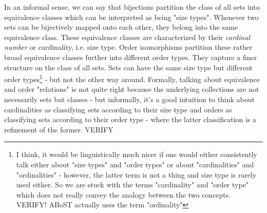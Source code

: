 \medskip
In an informal sense, we can say that bijections partition the class of all sets into equivalence classes which can be interpreted as being "size types". Whenever two sets can be bijectively mapped onto each other, they belong into the same equivalence class. These equivalence classes are characterized by their \emph{cardinal number} or cardinality, i.e. size type. Order isomorphisms partition these rather broad equivalence classes further into different order types. They capture a finer structure on the class of all sets. Sets can have the same size type but different order types\footnote{I think, it would be linguistically much nicer if one would either consistently talk either about "size types" and "order types" or about "cardinalities" and "ordinalities" - however, the latter term is not a thing and size type is rarely used either. So we are stuck with the terms "cardinality" and "order type" which does not really convey the analogy between the two concepts. VERIFY! ABoST actually uses the term "ordinality"} - but not the other way around. Formally, talking about equivalence and order "relations" is not quite right because the underlying collections are not necessarily sets but classes - but informally, it's a good intuition to think about cardinalities as classifying sets according to their size type and orders as classifying sets according to their order type - where the latter classification is a refinement of the former. VERIFY








